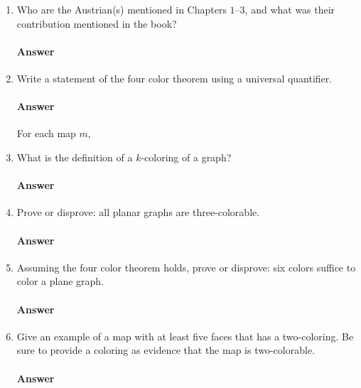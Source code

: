\documentclass{article}
\begin{document}
\begin{enumerate}

    \item Who are the Austrian(s) mentioned in Chapters $1$--$3$, and what was their
        contribution mentioned in the book?

        \paragraph{Answer}

    \item Write a statement of the four color theorem using a universal
        quantifier.

        \paragraph{Answer}
        For each map $m$, 

    \item What is the definition of a $k$-coloring of a graph?

        \paragraph{Answer}

    \item Prove or disprove: all planar graphs are three-colorable.

        \paragraph{Answer}
        \todo{}

    \item Assuming the four color theorem holds, prove or disprove: six colors
        suffice to color a plane graph.

        \paragraph{Answer}
        \todo{}

    \item Give an example of a map with at least five faces that has a
        two-coloring.  Be sure to provide a coloring as evidence that the map is
        two-colorable.

        \paragraph{Answer}


\end{enumerate}
\end{document}
